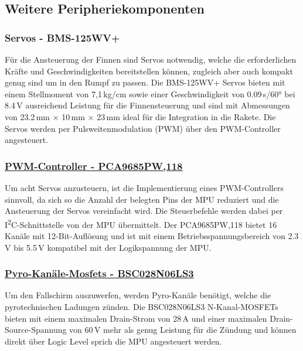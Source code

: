 \subsection{Weitere Peripheriekomponenten}
\label{subsec:weitere_peripheriekomponenten}
\subsubsection{Servos - BMS-125WV+}
Für die Ansteuerung der Finnen sind Servos notwendig, welche die erforderlichen Kräfte und Geschwindigkeiten bereitstellen können, zugleich aber auch kompakt genug sind um in den Rumpf zu passen. Die BMS-125WV+ Servos bieten mit einem Stellmoment von 7,1\,kg/cm sowie einer Geschwindigkeit von 0.09\,s/60° bei 8.4\,V ausreichend Leistung für die Finnensteuerung und sind mit Abmessungen von 23.2\,mm $\times$ 10\,mm $\times$ 23\,mm ideal für die Integration in die Rakete. Die Servos werden per Pulsweitenmodulation (PWM) über den PWM-Controller angesteuert.
\subsubsection{\href{https://www.nxp.com/products/power-drivers/lighting-driver-and-controller-ics/led-drivers/16-channel-12-bit-pwm-fm-plus-ic-bus-led-driver:PCA9685}{PWM-Controller - PCA9685PW,118}}
Um acht Servos anzusteuern, ist die Implementierung eines PWM-Controllers sinnvoll, da sich so die Anzahl der belegten Pins der MPU reduziert und die Ansteuerung der Servos vereinfacht wird.
Die Steuerbefehle werden dabei per I\textsuperscript{2}C-Schnittstelle von der MPU übermittelt. Der PCA9685PW,118 bietet 16 Kanäle mit 12-Bit-Auflösung und ist mit einem Betriebsspannungsbereich von 2.3\,V bis 5.5\,V kompatibel mit der Logikspannung der MPU.
\subsubsection{\href{https://www.infineon.com/assets/row/public/documents/24/49/infineon-bsc028n06ls3-g-datasheet-en.pdf?fileId=db3a30431ddc9372011ebafa4c607f8c}{Pyro-Kanäle-Mosfets - BSC028N06LS3}}
Um den Fallschirm auszuwerfen, werden Pyro-Kanäle benötigt, welche die pyrotechnischen Ladungen zünden. Die BSC028N06LS3 N-Kanal-MOSFETs bieten mit einem maximalen Drain-Strom von 28\,A und einer maximalen Drain-Source-Spannung von 60\,V mehr als genug Leistung für die Zündung und können direkt über Logic Level sprich die MPU angesteuert werden.



